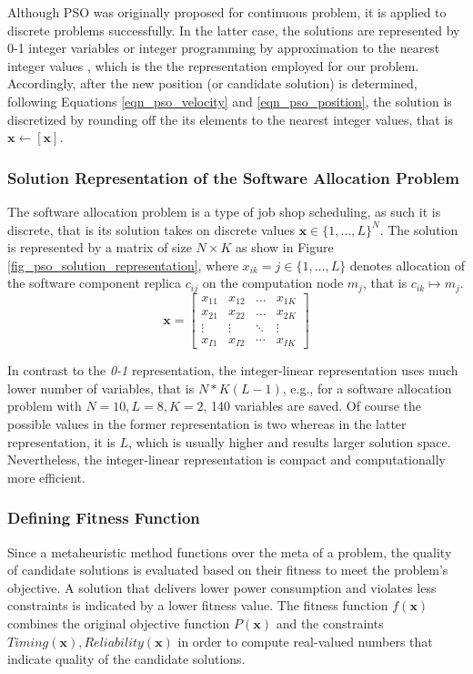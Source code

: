 Although PSO was originally proposed for continuous problem, it is applied to discrete problems successfully. In the latter case, the solutions are represented by 0-1 integer variables \cite{KennedyAAlgorithm} or integer programming by approximation to the nearest integer values \cite{Clerc2000DiscreteProblem}, which is the the representation employed for our problem. Accordingly, after the new position (or candidate solution) is determined, following Equations \ref{eqn_pso_velocity} and \ref{eqn_pso_position}, the solution is discretized by rounding off the its elements to the nearest integer values, that is $\textbf{x}\leftarrow [\textbf{x}]$.

\subsubsection{Solution Representation of the Software Allocation Problem}
The software allocation problem is a type of job shop scheduling, as such it is discrete, that is its solution takes on discrete values $\textbf{x}\in \{1,…,L\}^N$. The solution is represented by a matrix of size $N\times K$ as show in Figure \ref{fig_pso_solution_representation}, where $x_{ik}=j\in \{1,…,L\}$ denotes allocation of the software component replica $c_{ij}$ on the computation node $m_j$, that is $c_{ik}\mapsto m_j$.
\begin{equation}
\label{fig_pso_solution_representation}
\textbf{x}=
\begin{bmatrix} 
x_{11} & x_{12} & \dots & x_{1K}\\
x_{21} & x_{22} & \dots & x_{2K}\\
\vdots & \vdots & \ddots & \vdots\\
x_{I1} & x_{I2} & \cdots & x_{IK}
\end{bmatrix}
\end{equation}

In contrast to the \textit{0-1} representation, the integer-linear representation uses much lower number of variables, that is $N*K(L-1)$, e.g., for a software allocation problem with $N=10,L=8,K=2$, 140 variables are saved. Of course the possible values in the former representation is two whereas in the latter representation, it is $L$, which is usually higher and results larger solution space. Nevertheless, the integer-linear representation is compact and computationally more efficient.

\subsubsection{Defining Fitness Function}
Since a metaheuristic method functions over the meta of a problem, the quality of candidate solutions is evaluated based on their fitness to meet the problem's objective. A solution that delivers lower power consumption and violates less constraints is indicated by a lower fitness value. The fitness function $f(\textbf{x})$ combines the original objective function $P(\textbf{x})$ and the constraints $Timing(\textbf{x}),Reliability(\textbf{x})$ in order to compute real-valued numbers that indicate quality of the candidate solutions.

